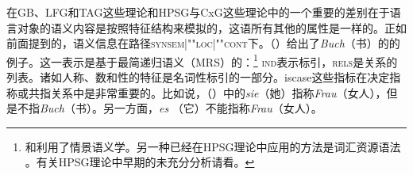 在GB、LFG和TAG这些理论和HPSG与CxG这些理论中的一个重要的差别在于语言对象的语义内容是按照特征结构来模拟的，这语所有其他的属性是一样的。正如前面提到的，语义信息在路径\textsc{synsem|""loc|""cont}下。（）给出了\emph{Buch}（书）的\contv 的例子。这一表示是基于最简递归语义\indexmrs （MRS）的：\footnote{
 \citet{ps2}和\citet{GSag2000a-u}利用了情景语义学\citep*{BP83a,CMP90,Devlin92}\nocite{BP87a}。另一种已经在HPSG理论中应用的方法是词汇资源语法 \citep{RS2004a-u}。有关HPSG理论中早期的未充分分析请看。
}
\ea
\label{le-buch}
\z
\textsc{ind}表示标引，\textsc{rels}是关系的列表。诸如人称、数和性的特征是名词性标引的一部分。is{case}这些指标在决定指称或共指关系中是非常重要的。比如说，（）中的\emph{sie}（她）指称\emph{Frau}（女人），但是不指\emph{Buch}（书）。另一方面，\emph{es} （它）不能指称\emph{Frau}（女人）。
